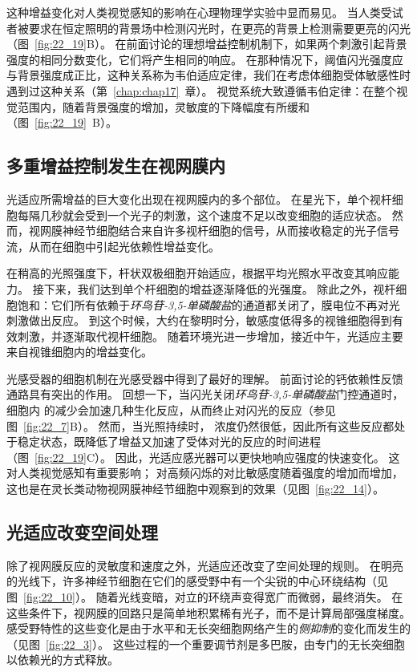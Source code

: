 这种增益变化对人类视觉感知的影响在心理物理学实验中显而易见。
当人类受试者被要求在恒定照明的背景场中检测闪光时，在更亮的背景上检测需要更亮的闪光（图~\ref{fig:22_19}B）。
在前面讨论的理想增益控制机制下，如果两个刺激引起背景强度的相同分数变化，它们将产生相同的响应。
在那种情况下，阈值闪光强度应与背景强度成正比，这种关系称为韦伯适应定律，我们在考虑体细胞受体敏感性时遇到过这种关系（第~\ref{chap:chap17}~章）。
视觉系统大致遵循韦伯定律：在整个视觉范围内，随着背景强度的增加，灵敏度的下降幅度有所缓和（图~\ref{fig:22_19}~B）。



\subsection{多重增益控制发生在视网膜内}

光适应所需增益的巨大变化出现在视网膜内的多个部位。 
在星光下，单个视杆细胞每隔几秒就会受到一个光子的刺激，这个速度不足以改变细胞的适应状态。
然而，视网膜神经节细胞结合来自许多视杆细胞的信号，从而接收稳定的光子信号流，从而在细胞中引起光依赖性增益变化。


在稍高的光照强度下，杆状双极细胞开始适应，根据平均光照水平改变其响应能力。
接下来，我们达到单个杆细胞的增益逐渐降低的光强度。 
除此之外，视杆细胞饱和：它们所有依赖于\textit{环鸟苷-3,5-单磷酸盐}的通道都关闭了，膜电位不再对光刺激做出反应。
到这个时候，大约在黎明时分，敏感度低得多的视锥细胞得到有效刺激，并逐渐取代视杆细胞。
随着环境光进一步增加，接近中午，光适应主要来自视锥细胞内的增益变化。


光感受器的细胞机制在光感受器中得到了最好的理解。
前面讨论的钙依赖性反馈通路具有突出的作用。
回想一下，当闪光关闭\textit{环鸟苷-3,5-单磷酸盐}门控通道时，细胞内  的减少会加速几种生化反应，从而终止对闪光的反应（参见图~\ref{fig:22_7}B）。
然而，当光照持续时， 浓度仍然很低，因此所有这些反应都处于稳定状态，既降低了增益又加速了受体对光的反应的时间进程（图~\ref{fig:22_19}C）。
因此，光适应感光器可以更快地响应强度的快速变化。
这对人类视觉感知有重要影响；
对高频闪烁的对比敏感度随着强度的增加而增加，这也是在灵长类动物视网膜神经节细胞中观察到的效果（见图~\ref{fig:22_14}）。



\subsection{光适应改变空间处理}

除了视网膜反应的灵敏度和速度之外，光适应还改变了空间处理的规则。
在明亮的光线下，许多神经节细胞在它们的感受野中有一个尖锐的中心环绕结构（见图~\ref{fig:22_10}）。 
随着光线变暗，对立的环绕声变得宽广而微弱，最终消失。
在这些条件下，视网膜的回路只是简单地积累稀有光子，而不是计算局部强度梯度。
感受野特性的这些变化是由于水平和无长突细胞网络产生的\textit{侧抑制}的变化而发生的（见图~\ref{fig:22_3}）。
这些过程的一个重要调节剂是多巴胺，由专门的无长突细胞以依赖光的方式释放。


